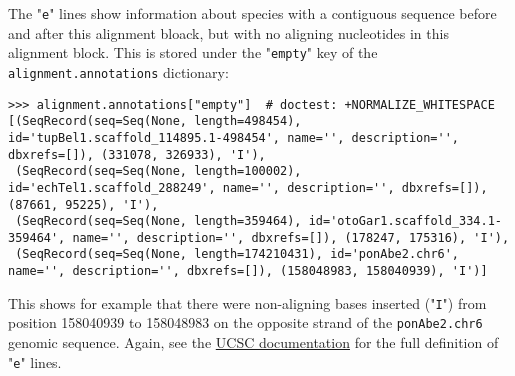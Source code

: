 The "\verb|e|" lines show information about species with a contiguous sequence before and after this alignment bloack, but with no aligning nucleotides in this alignment block. This is stored under the "\verb|empty|" key of the \verb|alignment.annotations| dictionary:
\begin{verbatim}
>>> alignment.annotations["empty"]  # doctest: +NORMALIZE_WHITESPACE
[(SeqRecord(seq=Seq(None, length=498454), id='tupBel1.scaffold_114895.1-498454', name='', description='', dbxrefs=[]), (331078, 326933), 'I'),
 (SeqRecord(seq=Seq(None, length=100002), id='echTel1.scaffold_288249', name='', description='', dbxrefs=[]), (87661, 95225), 'I'),
 (SeqRecord(seq=Seq(None, length=359464), id='otoGar1.scaffold_334.1-359464', name='', description='', dbxrefs=[]), (178247, 175316), 'I'),
 (SeqRecord(seq=Seq(None, length=174210431), id='ponAbe2.chr6', name='', description='', dbxrefs=[]), (158048983, 158040939), 'I')]
\end{verbatim}
This shows for example that there were non-aligning bases inserted ("\verb|I|") from position 158040939 to 158048983 on the opposite strand of the \verb|ponAbe2.chr6| genomic sequence.
Again, see the \href{https://genome.ucsc.edu/FAQ/FAQformat.html#format5}{UCSC documentation} for the full definition of "\verb|e|" lines.

